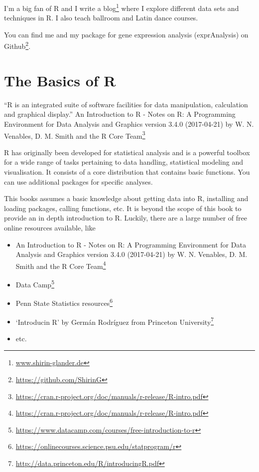 \documentclass[12pt,]{krantz}
\providecommand{\tightlist}{%
  \setlength{\itemsep}{0pt}\setlength{\parskip}{0pt}}
\renewenvironment{quote}{\begin{VF}}{\end{VF}}
\renewcommand{\href}[2]{#2\footnote{\url{#1}}}
\theoremstyle{definition}
\theoremstyle{definition}
\theoremstyle{definition}
\theoremstyle{remark}
\begin{document}
I'm a big fan of R and I write \href{www.shirin-glander.de}{a blog}
where I explore different data sets and techniques in R. I also teach
ballroom and Latin dance courses.

You can find me and my package for gene expression analysis
(exprAnalysis) on \href{https://github.com/ShirinG}{Github}.

\chapter*{The Basics of R}\label{the-basics-of-r}


\begin{quote}
``R is an integrated suite of software facilities for data manipulation,
calculation and graphical display.''
\href{https://cran.r-project.org/doc/manuals/r-release/R-intro.pdf}{An
Introduction to R - Notes on R: A Programming Environment for Data
Analysis and Graphics version 3.4.0 (2017-04-21) by W. N. Venables, D.
M. Smith and the R Core Team}
\end{quote}

R has originally been developed for statistical analysis and is a
powerful toolbox for a wide range of tasks pertaining to data handling,
statistical modeling and visualisation. It consists of a core
distribution that contains basic functions. You can use additional
packages for specific analyses.

This books assumes a basic knowledge about getting data into R,
installing and loading packages, calling functions, etc. It is beyond
the scope of this book to provide an in depth introduction to R.
Luckily, there are a large number of free online resources available,
like

\begin{itemize}
\tightlist
\item
  \href{https://cran.r-project.org/doc/manuals/r-release/R-intro.pdf}{An
  Introduction to R - Notes on R: A Programming Environment for Data
  Analysis and Graphics version 3.4.0 (2017-04-21) by W. N. Venables, D.
  M. Smith and the R Core Team}
\item
  \href{https://www.datacamp.com/courses/free-introduction-to-r}{Data
  Camp}
\item
  \href{https://onlinecourses.science.psu.edu/statprogram/r}{Penn State
  Statistics resources}
\item
  \href{http://data.princeton.edu/R/introducingR.pdf}{`Introducin R' by
  Germán Rodríguez from Princeton University}
\item
  etc.
\end{itemize}
\end{document}
